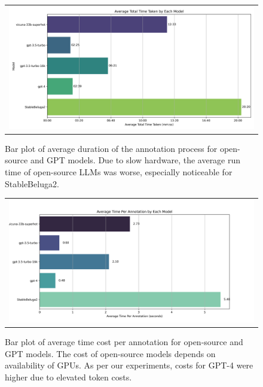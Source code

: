 \begin{figure}[htpb]
  \centering
  \begin{tabular}{c}
  \includegraphics[width=14cm]{images/open-runtime.png}
  \end{tabular}
  \caption[Open Source Time]{Bar plot of average duration of the annotation process for open-source and GPT models. Due to slow hardware, the average run time of open-source LLMs was worse, especially noticeable for StableBeluga2.}\label{fig:open-runtime}
\end{figure}

\begin{figure}[htpb]
  \centering
  \begin{tabular}{c}
  \includegraphics[width=14cm]{images/open-anno-cost.png}
  \end{tabular}
  \caption[Open Source Cost]{Bar plot of average time cost per annotation for open-source and GPT models. The cost of open-source models depends on availability of GPUs. As per our experiments, costs for GPT-4 were higher due to elevated token costs.}\label{fig:open-relative-cost}
\end{figure}

